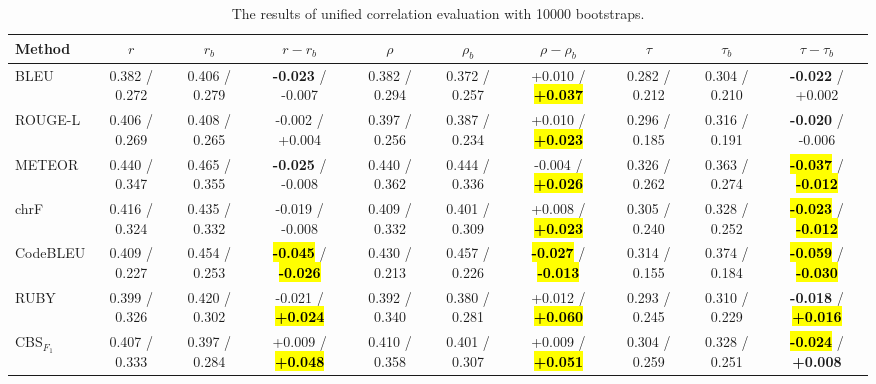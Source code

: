 \begin{table}[t]
    \centering
    \scriptsize
    \setlength{\tabcolsep}{3.5pt}
    \caption{The results of unified correlation evaluation with 10000 bootstraps.}
    \label{tab:unified-settings}
    \begin{tabular}{@{}
        l|ccc|ccc|ccc@{}}
        \toprule
        Method & $r$ & $r_b$ & $r-r_b$ & $\rho$ & $\rho_b$ & $\rho-\rho_b$ & $\tau$ & $\tau_b$ & $\tau-\tau_b$ \\
        \midrule
        \midrule
        BLEU                    & 0.382 / 0.272   & 0.406 / 0.279   & \textbf{-0.023} / -0.007            & 0.382 / 0.294   & 0.372 / 0.257   & +0.010 / \hl{\textbf{+0.037}}       & 0.282 / 0.212   & 0.304 / 0.210   & \textbf{-0.022} / +0.002            \\
        ROUGE-L                 & 0.406 / 0.269   & 0.408 / 0.265   & -0.002 / +0.004                     & 0.397 / 0.256   & 0.387 / 0.234   & +0.010 / \hl{\textbf{+0.023}}       & 0.296 / 0.185   & 0.316 / 0.191   & \textbf{-0.020} / -0.006            \\
        METEOR                  & 0.440 / 0.347   & 0.465 / 0.355   & \textbf{-0.025} / -0.008            & 0.440 / 0.362   & 0.444 / 0.336   & -0.004 / \hl{\textbf{+0.026}}       & 0.326 / 0.262   & 0.363 / 0.274   & \hl{\textbf{-0.037}} / \hl{\textbf{-0.012}} \\
        chrF                    & 0.416 / 0.324   & 0.435 / 0.332   & -0.019 / -0.008                     & 0.409 / 0.332   & 0.401 / 0.309   & +0.008 / \hl{\textbf{+0.023}}       & 0.305 / 0.240   & 0.328 / 0.252   & \hl{\textbf{-0.023}} / \hl{\textbf{-0.012}} \\
        CodeBLEU                & 0.409 / 0.227   & 0.454 / 0.253   & \hl{\textbf{-0.045}} / \hl{\textbf{-0.026}} & 0.430 / 0.213   & 0.457 / 0.226   & \hl{\textbf{-0.027}} / \hl{\textbf{-0.013}} & 0.314 / 0.155   & 0.374 / 0.184   & \hl{\textbf{-0.059}} / \hl{\textbf{-0.030}} \\
        RUBY                    & 0.399 / 0.326   & 0.420 / 0.302   & -0.021 / \hl{\textbf{+0.024}}       & 0.392 / 0.340   & 0.380 / 0.281   & +0.012 / \hl{\textbf{+0.060}}       & 0.293 / 0.245   & 0.310 / 0.229   & \textbf{-0.018} / \hl{\textbf{+0.016}} \\
        CBS$_{F_1}$             & 0.407 / 0.333   & 0.397 / 0.284   & +0.009 / \hl{\textbf{+0.048}}       & 0.410 / 0.358   & 0.401 / 0.307   & +0.009 / \hl{\textbf{+0.051}}       & 0.304 / 0.259   & 0.328 / 0.251   & \hl{\textbf{-0.024}} / \textbf{+0.008} \\

\end{tabular}
\end{table}
